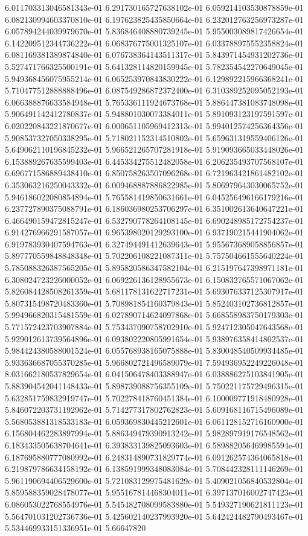 	6.011703313046581343e-01	6.291730165727638102e-01	6.059214103530878859e-01	6.082130994603370810e-01	6.197623825435850664e-01	6.232012763256973287e-01	6.057894244039979670e-01	5.836846408880739245e-01	5.955003089817426654e-01	6.142209512344736222e-01	6.068376775001325107e-01	6.033788975552358824e-01	6.081169381389874840e-01	6.076738364143511317e-01	5.843971454931202736e-01	5.527471766325500191e-01	5.641328114820159945e-01	5.782354542270649045e-01	5.949368456075955214e-01	6.065253970843830222e-01	6.129892215966368241e-01	5.710477512888888496e-01	6.087549286872372400e-01	6.310389252095052193e-01	6.066388876633584948e-01	5.765336111924673768e-01	5.886447381083748098e-01	5.906491142412780837e-01	5.948801030073384011e-01	5.891093123197591597e-01	6.020220843221870677e-01	6.000651105969412313e-01	5.994012574256364356e-01	5.908537327050338295e-01	5.718021152314510802e-01	5.659631319559406126e-01	5.649062110196845232e-01	5.966521265707281918e-01	5.919093665033448026e-01	6.153889267635599403e-01	6.445334275512482058e-01	6.206235493707568107e-01	6.696771586889438410e-01	6.850758263507096268e-01	6.721963421861482102e-01	6.353063216250043332e-01	6.009468887886822985e-01	5.806979643030065752e-01	5.946186022080854894e-01	5.765581419850631661e-01	6.045256496166179216e-01	6.237727890375088791e-01	6.186036980253706297e-01	6.351002613640647221e-01	6.466490159472815247e-01	6.532790778264108145e-01	6.690248985172754237e-01	6.914276966291587057e-01	6.965398020129293100e-01	6.937190215441904062e-01	6.919783930407594763e-01	6.327494491412639643e-01	5.955673689058856857e-01	5.897770559848848348e-01	5.702206108221087311e-01	5.757504661555640224e-01	5.785088326387565205e-01	5.895820586347582104e-01	6.215197647398971181e-01	6.308024723226000052e-01	6.069226136128955673e-01	6.150832765571067062e-01	5.826084428508261359e-01	5.681178131622717231e-01	5.693076337125307917e-01	5.807315498720483360e-01	5.708981854160379843e-01	5.852403102736812857e-01	5.994966820315481559e-01	6.027890714624097868e-01	5.668558983750179303e-01	5.771572423703907884e-01	5.753437090758702910e-01	5.924712305047643568e-01	5.929012613739564896e-01	6.093802220805991654e-01	5.938976358414802537e-01	5.984424380588001524e-01	6.055768938165075888e-01	5.830048540509934485e-01	5.933636687055370285e-01	5.966802721496589079e-01	7.594936952249226048e-01	8.031662180537829654e-01	6.041506478403388947e-01	6.038886275103841905e-01	5.883904542041148433e-01	5.898739088756355109e-01	5.750221175729496315e-01	5.632851759832919747e-01	5.702278418760451384e-01	6.100009771918480928e-01	5.846072203731192962e-01	5.714277317802762823e-01	5.609168116715496089e-01	5.568053881318533183e-01	6.059369830445212601e-01	6.061128152716160900e-01	6.156804462283897994e-01	5.886349479390913242e-01	5.982897919176548562e-01	6.183433505638704641e-01	6.393833139825093603e-01	6.589882056469985594e-01	6.187695880777080992e-01	6.248314890731829774e-01	6.091262574364065818e-01	6.219879786634158192e-01	6.138591999348083084e-01	5.708442328111146269e-01	5.961190694406529600e-01	5.721083129975481629e-01	5.409021056840532804e-01	5.859588359028478077e-01	5.955167814468304011e-01	6.397137016002747423e-01	6.086053022768554976e-01	5.545482708099583880e-01	5.549327190621811123e-01	5.564701031202736736e-01	5.425602140237993920e-01	5.642424482790493467e-01	5.534469933151336951e-01	5.66647820